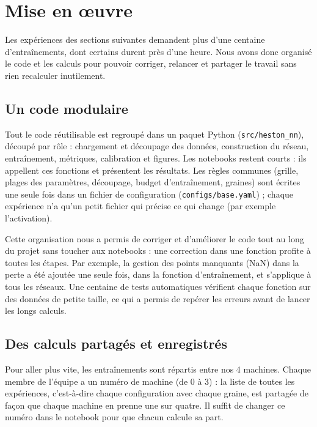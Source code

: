 
\section{Mise en œuvre}
\label{sec-mise-en-oeuvre}

Les expériences des sections suivantes demandent plus d'une centaine d'entraînements, dont certains durent près
d'une heure. Nous avons donc organisé le code et les calculs pour pouvoir corriger, relancer et partager le travail
sans rien recalculer inutilement.

\subsection{Un code modulaire}

Tout le code réutilisable est regroupé dans un paquet Python (\texttt{src/heston\_nn}), découpé par rôle :
chargement et découpage des données, construction du réseau, entraînement, métriques, calibration et figures.
Les notebooks restent courts : ils appellent ces fonctions et présentent les résultats. Les règles communes
(grille, plages des paramètres, découpage, budget d'entraînement, graines) sont écrites une seule fois dans un
fichier de configuration (\texttt{configs/base.yaml}) ; chaque expérience n'a qu'un petit fichier qui précise ce
qui change (par exemple l'activation).

Cette organisation nous a permis de corriger et d'améliorer le code tout au long du projet sans toucher aux
notebooks : une correction dans une fonction profite à toutes les étapes. Par exemple, la gestion des points
manquants (NaN) dans la perte a été ajoutée une seule fois, dans la fonction d'entraînement, et s'applique à tous
les réseaux. Une centaine de tests automatiques vérifient chaque fonction sur des données de petite taille, ce qui
a permis de repérer les erreurs avant de lancer les longs calculs.

\subsection{Des calculs partagés et enregistrés}

Pour aller plus vite, les entraînements sont répartis entre nos 4 machines. Chaque membre de l'équipe a un numéro
de machine (de 0 à 3) : la liste de toutes les expériences, c'est-à-dire chaque configuration avec chaque graine,
est partagée de façon que chaque machine en prenne une sur quatre. Il suffit de changer ce numéro dans le notebook
pour que chacun calcule sa part.

